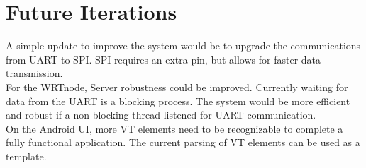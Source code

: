 \documentclass[paper=a4, fontsize=11pt]{scrartcl}
\numberwithin{equation}{section}		%
\numberwithin{figure}{section}			%
\numberwithin{table}{section}				%
\begin{document}
\pagebreak
\section{Future Iterations}
A simple update to improve the system would be to upgrade the communications from UART to SPI. SPI requires an extra pin, but allows for faster data transmission. \\

For the WRTnode, Server robustness could be improved. Currently waiting for data from the UART is a blocking process. The system would be more efficient and robust if a non-blocking thread listened for UART communication. \\

On the Android UI, more VT elements need to be recognizable to complete a fully functional application. The current parsing of VT elements can be used as a template.\\
\end{document}
